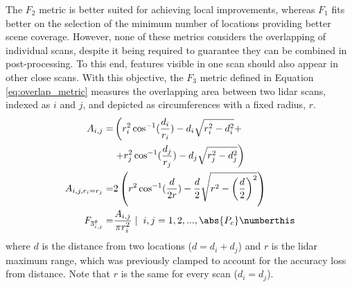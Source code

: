 The $F_2$ metric is better suited for achieving local improvements, whereas $F_1$ fits better on the selection of the minimum number of locations providing better scene coverage. However, none of these metrics considers the overlapping of individual scans, despite it being required to guarantee they can be combined in post-processing. To this end, features visible in one scan should also appear in other close scans. With this objective, the $F_3$ metric defined in Equation \ref{eq:overlap_metric} measures the overlapping area between two \acrshort{lidar} scans, indexed as $i$ and $j$, and depicted as circumferences with a fixed radius, $r$.  
\begin{align*}
    A_{i, j} =& \left(r_{i}^{2} \cos^{-1}(\frac{d_i}{r_{i}}) - d_i \sqrt{r_{i}^2 - d_{i}^{2}} +\right. \\
    &\left.+ r_{j}^{2} \cos^{-1}(\frac{d_j}{r_{j}}) - d_j \sqrt{r_{j}^2 - d_{j}^{2}}\right)\\  
    A_{i, j, r_i = r_j} =& 2\left(r^{2} \cos^{-1}(\frac{d}{2r}) - \frac{d}{2} \sqrt{r^2 - \left(\frac{d}{2}\right)^{2}}\right)\\
    \textit{F}_{3_{i, j}^\theta} =& \frac{A_{i, j}}{\pi r_{i}^2} \hspace{1mm} | \hspace{2mm} i, j = 1, 2, ..., \abs{P_c}
    \numberthis \label{eq:overlap_metric}
\end{align*}
where $d$ is the distance from two locations ($d = d_i + d_j$) and $r$ is the \acrshort{lidar} maximum range, which was previously clamped to account for the accuracy loss from distance. Note that $r$ is the same for every scan ($d_i = d_j$).


